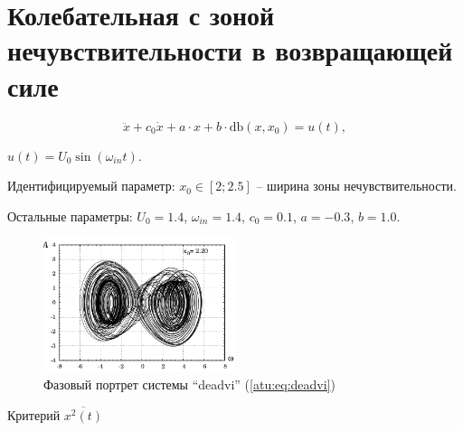 
\FloatBarrier

\section{Колебательная с зоной нечувствительности в возвращающей силе} %


\begin{equation}
\ddot{x} + c_0 \dot{x} + a \cdot x + b \cdot \mathrm{db}(x,x_0) = u(t),
\label{atu:eq:deadvi}
\end{equation}

$ u(t) = U_0 \sin( \omega_{in} t ) $.

Идентифицируемый параметр:
$ x_0 \in [2;2.5] $ -- ширина зоны нечувствительности.

Остальные параметры:
$U_0 = 1.4$, $\omega_{in} = 1.4$, $c_0=0.1$, $a=-0.3$, $b=1.0$.


\begin{figure}[htb!]
\centerline{\includegraphics[width=0.5\textwidth]{p/cha/deadvi_phase.pdf} }
\caption{Фазовый портрет системы ``deadvi'' (\ref{atu:eq:deadvi})}
\label{atu:f:deadvi_phase}
\end{figure}

Критерий
$\overline{x^2(t)}$


